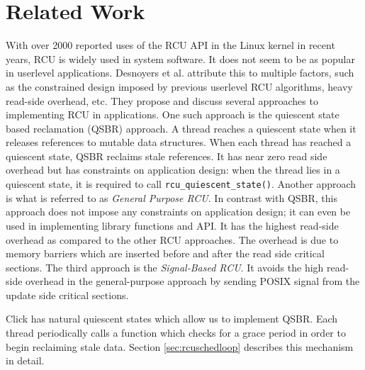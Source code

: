 \documentclass[a4paper]{article}
\begin{document}
\section{Related Work}
With over 2000 reported uses of the RCU API \cite{rcuusage} in the Linux kernel in recent years, RCU is widely used in system software. It does not seem to be as popular in userlevel applications. Desnoyers et al. \cite{urcu} attribute this to multiple factors, such as the constrained design imposed by previous userlevel RCU algorithms, heavy read-side overhead, etc. They propose and discuss several approaches to implementing RCU in applications. One such approach is the quiescent state based reclamation (QSBR) approach. A thread reaches a quiescent state when it releases references to mutable data structures. When each thread has reached a quiescent state, QSBR reclaims stale references. It has near zero read side overhead but has constraints on application design: when the thread lies in a quiescent state, it is required to call \verb+rcu_quiescent_state()+. Another approach is what is referred to as \emph{General Purpose RCU}. In contrast with QSBR, this approach does not impose any constraints on application design; it can even be used in implementing library functions and API. It has the highest read-side overhead as compared to the other RCU approaches. The overhead is due to memory barriers which are inserted before and after the read side critical sections. The third approach is the \emph{Signal-Based RCU}. It avoids the high read-side overhead in the general-purpose approach by sending POSIX signal from the update side critical sections.

Click has natural quiescent states which allow us to implement QSBR. Each thread periodically calls a function which checks for a grace period in order to begin reclaiming stale data. Section \ref{sec:rcuschedloop} describes this mechanism in detail.\\
\end{document}
